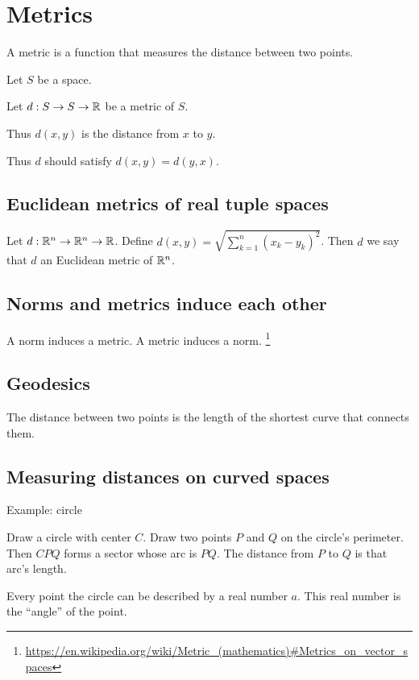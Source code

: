 \chapter{Metrics}

A metric is a function that measures the distance between two points.

Let \(S\) be a space.

Let \(d : S \to S \to \mathbb{R}\) be a metric of \(S\).

Thus \(d(x,y)\) is the distance from \(x\) to \(y\).

Thus \(d\) should satisfy \(d(x,y) = d(y,x)\).

\section*{Euclidean metrics of real tuple spaces}

Let \(d : \mathbb{R}^n \to \mathbb{R}^n \to \mathbb{R}\).
Define \(d(x,y) = \sqrt{\sum_{k=1}^n (x_k - y_k)^2}\).
Then \(d\) we say that \(d\) an Euclidean metric of \(\mathbb{R}^n\).

\section{Norms and metrics induce each other}

A norm induces a metric.
A metric induces a norm.%
\footnote{\url{https://en.wikipedia.org/wiki/Metric_(mathematics)\#Metrics_on_vector_spaces}}

\section{Geodesics}

The distance between two points is the length of the shortest curve that connects them.

\section{Measuring distances on curved spaces}

Example: circle

Draw a circle with center \(C\).
Draw two points \(P\) and \(Q\) on the circle's perimeter.
Then \(CPQ\) forms a sector whose arc is \(PQ\).
The distance from \(P\) to \(Q\) is that arc's length.

Every point the circle can be described by a real number \(a\).
This real number is the \enquote{angle} of the point.

